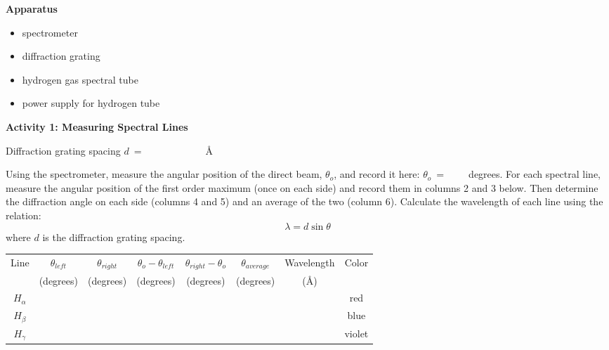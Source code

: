 \textbf{Apparatus}

\begin{itemize}

\item spectrometer

\item diffraction grating

\item hydrogen gas spectral tube

\item power supply for hydrogen tube

\end{itemize}


\vspace{0.2in}

\textbf{Activity 1: Measuring Spectral Lines}

\bigskip

\noindent Diffraction grating spacing $d ~ = ~\qquad\qquad\qquad${\AA}
 
Using the spectrometer, measure the angular position of the direct beam, 
$\theta_{o}$, and record it here:  $\theta_{o} ~ = ~\qquad$degrees.
For each spectral line, measure the angular position of the first order maximum 
(once on each side) and record them in columns 2 and 3 below. Then determine the
 diffraction angle on each side (columns 4 and 5) and an average of the two 
(column 6). Calculate the wavelength of each line using the relation:
\begin{equation}
\lambda = d \sin \theta
\end{equation}
where $d$ is the diffraction grating spacing.

\vspace{0.25in}

\begin{center}
\begin{tabular}{|c|c|c|c|c|c|c|c|}\hline
Line        & $\theta_{left}$     & $\theta_{right}$     & $\theta_{o} - \theta_{left}$     & $\theta_{right} - \theta_{o}$    & $\theta_{average}$ & Wavelength  &  Color \\ 
            & (degrees)  &  (degrees)  & (degrees)  & (degrees) & (degrees) &({\AA})     &        \\ \hline
$H_\alpha$  &                     &                      &                    &             &     &    & red     \\ \hline
$H_\beta$   &                     &                      &                    &             &     &    & blue  \\ \hline
$H_\gamma$  &                     &                      &                    &             &     &    & violet  \\ \hline
\end{tabular}
\end{center}

